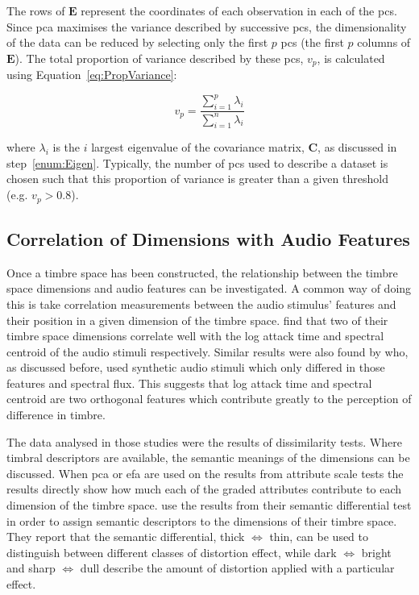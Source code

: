 		The rows of $\mathbf{E}$ represent the coordinates of each observation in each of the \acrshort{pc}s. Since
		\acrshort{pca} maximises the variance described by successive \acrshort{pc}s, the dimensionality of the
		data can be reduced by selecting only the first $p$ \acrshort{pc}s (the first $p$ columns of $\mathbf{E}$).
		The total proportion of variance described by these \acrshort{pc}s, $v_{p}$, is calculated using
		Equation~\ref{eq:PropVariance}:

		\begin{equation}
			v_{p} = \frac{\sum_{i = 1}^{p} \lambda_{i}}{\sum_{i = 1}^{n} \lambda_{i}}
			\label{eq:PropVariance}
		\end{equation}

		where $\lambda_{i}$ is the $i$ largest eigenvalue of the covariance matrix, $\mathbf{C}$, as
		discussed in step~\ref{enum:Eigen}. Typically, the number of \acrshort{pc}s used to describe a dataset is
		chosen such that this proportion of variance is greater than a given threshold (e.g. $v_{p} > 0.8$).

	\subsection{Correlation of Dimensions with Audio Features}
	\label{sec:Timbre-DimensionalityReduction-DimensionCorrelations}
		Once a timbre space has been constructed, the relationship between the timbre space dimensions and audio
		features can be investigated. A common way of doing this is take correlation measurements between the audio
		stimulus' features and their position in a given dimension of the timbre space.
		\citet{mcadams1995perceptual} find that two of their timbre space dimensions correlate well with the log
		attack time and spectral centroid of the audio stimuli respectively. Similar results were also found by
		\citet{caclin2005acoustic} who, as discussed before, used synthetic audio stimuli which only differed in
		those features and spectral flux. This suggests that log attack time and spectral centroid are two
		orthogonal features which contribute greatly to the perception of difference in timbre.
		
		The data analysed in those studies were the results of dissimilarity tests. Where timbral descriptors are
		available, the semantic meanings of the dimensions can be discussed. When \acrshort{pca} or \acrshort{efa}
		are used on the results from attribute scale tests the results directly show how much each of the graded
		attributes contribute to each dimension of the timbre space. \citet{marui2005timbre} use the results from
		their semantic differential test in order to assign semantic descriptors to the dimensions of their timbre
		space.  They report that the semantic differential, thick $\Leftrightarrow$ thin, can be used to
		distinguish between different classes of distortion effect, while dark $\Leftrightarrow$ bright and sharp
		$\Leftrightarrow$ dull describe the amount of distortion applied with a particular effect.

